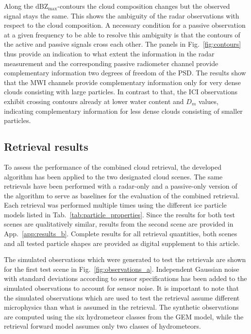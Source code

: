 \documentclass[journal abbreviation, manuscript]{copernicus}
\begin{document}
Along the $\text{dBZ}_\text{max}$-contours the cloud composition changes but the
observed signal stays the same. This shows the ambiguity of the radar
observations with respect to the cloud composition. A necessary condition for a
passive observation at a given frequency to be able to resolve this ambiguity is
that the contours of the active and passive signals cross each other. The panels
in Fig.~\ref{fig:contours} thus provide an indication to what extent the
information in the radar measurement and the corresponding passive radiometer
channel provide complementary information two degrees of freedom of the PSD. The
results show that the MWI channels provide complementary information only for
very dense clouds consisting with large particles. In contrast to that, the ICI
observations exhibit crossing contours already at lower water content and $D_m$
values, indicating complementary information for less dense clouds consisting of
smaller particles.

\subsection{Retrieval results}

To assess the performance of the combined cloud retrieval, the developed
algorithm has been applied to the two designated cloud scenes. The same
retrievals have been performed with a radar-only and a passive-only version of
the algorithm to serve as baselines for the evaluation of the combined
retrieval. Each retrieval was performed multiple times using the different ice
particle models listed in Tab.~\ref{tab:particle_properties}. Since the results
for both test scenes are qualitatively similar, results from the second scene
are provided in App.~\ref{app:results_b}. Complete results for all retrieval quantities,
both scenes and all tested particle shapes are provided as digital supplement to
this article.

The simulated observations which were generated to test the retrievals
are shown for the first test scene in Fig.~\ref{fig:observations_a}. Independent
Gaussian noise with standard deviations according to sensor specifications has
been added to the simulated observations to account for sensor noise. It is
important to note that the simulated observations which are used to test the
retrieval assume different microphysics than what is assumed in the retrieval.
The synthetic observations are computed using the six hydrometeor classes from
the GEM model, while the retrieval forward model assumes only two classes of
hydrometeors.
\end{document}
